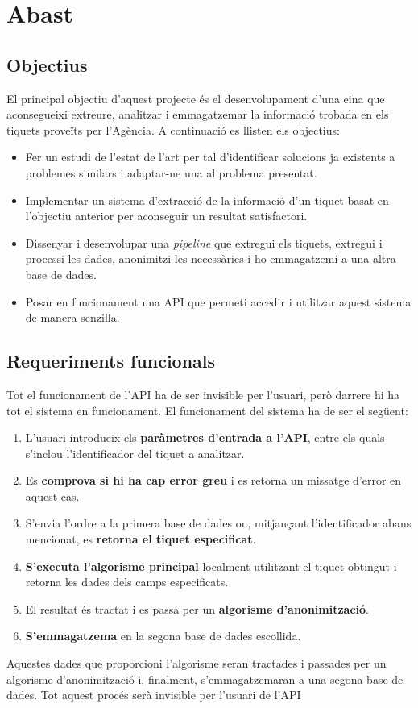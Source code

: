 \section{Abast}

\subsection{Objectius} \label{ssec:objectius}

El principal objectiu d'aquest projecte és el desenvolupament d'una eina que aconsegueixi extreure, analitzar i emmagatzemar la informació trobada en els tiquets proveïts per l'Agència. A continuació es llisten els objectius:

\begin{itemize}
    \item Fer un estudi de l’estat de l’art per tal d’identificar solucions ja existents a problemes similars i adaptar-ne una al problema presentat.
    \item Implementar un sistema d'extracció de la informació d'un tiquet basat en l'objectiu anterior per aconseguir un resultat satisfactori.
    \item Dissenyar i desenvolupar una \textit{pipeline} que extregui els tiquets, extregui i processi les dades, anonimitzi les necessàries i ho emmagatzemi a una altra base de dades. 
    \item Posar en funcionament una API que permeti accedir i utilitzar aquest sistema de manera senzilla.
\end{itemize}


\subsection{Requeriments funcionals}

Tot el funcionament de l'API ha de ser invisible per l'usuari, però darrere hi ha tot el sistema en funcionament. El funcionament del sistema ha de ser el següent: 
\begin{enumerate}
    \item L'usuari introdueix els \textbf{paràmetres d'entrada a l'API}, entre els quals s'inclou l'identificador del tiquet a analitzar.
    \item Es \textbf{comprova si hi ha cap error greu} i es retorna un missatge d'error en aquest cas.
    \item S'envia l'ordre a la primera base de dades on, mitjançant l'identificador abans mencionat, es \textbf{retorna el tiquet especificat}.
    \item \textbf{S'executa l'algorisme principal} localment utilitzant el tiquet obtingut i retorna les dades dels camps especificats.
    \item El resultat és tractat i es passa per un \textbf{algorisme d'anonimització}.
    \item \textbf{S'emmagatzema} en la segona base de dades escollida.
\end{enumerate}
Aquestes dades que proporcioni l'algorisme seran tractades i passades per un algorisme d'anonimització i, finalment, s'emmagatzemaran a una segona base de dades. Tot aquest procés serà invisible per l'usuari de l'API 


